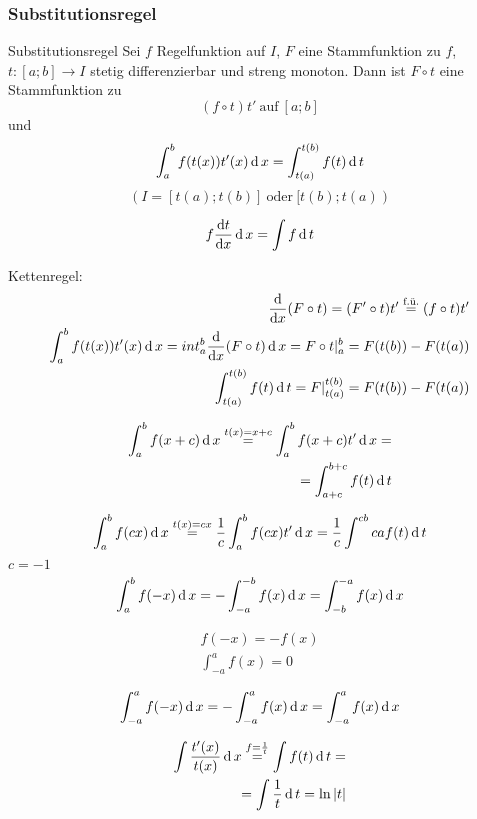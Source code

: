 \subsubsection{Substitutionsregel}
\begin{Sat}{Substitutionsregel}
  Sei $f$ Regelfunktion auf $I$, $F$ eine Stammfunktion zu $f$, $t:[a;b]\to I$ stetig differenzierbar und streng monoton. Dann ist $F\circ t$ eine Stammfunktion zu
  \[(f\circ t)t'\ \text{auf}\ [a;b]\]
  und
  \[\int^b_af(t(x))t'(x)\operatorname{d} x=\int^{t(b)}_{t(a)}f(t)\operatorname{d} t\]
  \[(I=[t(a);t(b)]\ \text{oder}\ [t(b);t(a))\]
\end{Sat}
\begin{Not}
  \[f\displaystyle\frac{\mathrm{d}t}{\mathrm{d}x}\operatorname{d} x=\int f\operatorname{d} t\]
\end{Not}
\begin{Bew}
  Kettenregel:
  \begin{align*}
    \displaystyle\frac{\mathrm{d}}{\mathrm{d}x}(F\circ t)=(F'\circ t)t'\stackrel{\text{f.ü.}}{=}(f\circ t)t'\\
    \int^b_af(t(x))t'(x)\operatorname{d} x=int^b_a\displaystyle\frac{\mathrm{d}}{\mathrm{d}x}(F\circ t)\operatorname{d} x=F\circ t|^b_a=F(t(b))-F(t(a))\\
    \int^{t(b)}_{t(a)}f(t)\operatorname{d} t=F|^{t(b)}_{t(a)}=F(t(b))-F(t(a))
  \end{align*}
\end{Bew}
\begin{Bsp}
  \begin{align*}
    \int^b_af(x+c)\operatorname{d} x\stackrel{t(x)=x+c}{=}\int^b_af(x+c)t'\operatorname{d} x=\\
    =\int^{b+c}_{a+c}f(t)\operatorname{d} t
  \end{align*}
\end{Bsp}
\begin{Bsp}
  \begin{align*}
    \int^b_af(cx)\operatorname{d} x\stackrel{t(x)=cx}{=}\frac{1}{c}\int^b_af(cx)t'\operatorname{d} x=\frac{1}{c}\int^{cb}{ca}f(t)\operatorname{d} t
  \end{align*}
  $c=-1$
  \begin{align*}
    \int^b_af(-x)\operatorname{d} x=-\int^{-b}_{-a}f(x)\operatorname{d} x=\int^{-a}_{-b}f(x)\operatorname{d} x
  \end{align*}
\end{Bsp}
\begin{Kor}
  \begin{align*}
    f(-x)=-f(x)\\
    \int^a_{-a}f(x)=0
  \end{align*}
\end{Kor}
\begin{Bew}
  \begin{align*}
    \int^a_{-a}f(-x)\operatorname{d} x=-\int^a_{-a}f(x)\operatorname{d} x=\int^a_{-a}f(x)\operatorname{d} x
  \end{align*}
\end{Bew}
\begin{Bsp}
  \begin{align*}
    \int\frac{t'(x)}{t(x)}\operatorname{d} x\stackrel{f=\frac{1}{t}}{=}\int f(t)\operatorname{d} t=\\
    =\int\frac{1}{t}\operatorname{d} t=\ln\left| t \right|
  \end{align*}
\end{Bsp}
